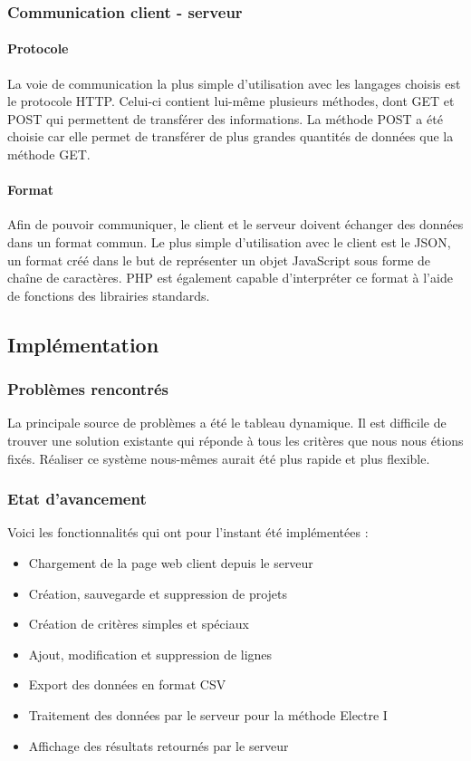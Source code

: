 \documentclass[a4paper]{article}
\begin{document}
\subsubsection{Communication client - serveur}

\paragraph{Protocole} La voie de communication la plus simple d'utilisation avec les langages choisis est le protocole HTTP. Celui-ci contient lui-même plusieurs méthodes, dont GET et POST qui permettent de transférer des informations. La méthode POST a été choisie car elle permet de transférer de plus grandes quantités de données que la méthode GET.

\paragraph{Format} Afin de pouvoir communiquer, le client et le serveur doivent échanger des données dans un format commun. Le plus simple d'utilisation avec le client est le JSON, un format créé dans le but de représenter un objet JavaScript sous forme de chaîne de caractères. PHP est également capable d'interpréter ce format à l'aide de fonctions des librairies standards. 

\newpage

\subsection{Implémentation}

\subsubsection{Problèmes rencontrés}

La principale source de problèmes a été le tableau dynamique. Il est difficile de trouver une solution existante qui réponde à tous les critères que nous nous étions fixés. Réaliser ce système nous-mêmes aurait été plus rapide et plus flexible.

\subsubsection{Etat d'avancement}

Voici les fonctionnalités qui ont pour l'instant été implémentées :

\begin{itemize}
\item Chargement de la page web client depuis le serveur
\item Création, sauvegarde et suppression de projets
\item Création de critères simples et spéciaux
\item Ajout, modification et suppression de lignes
\item Export des données en format CSV
\item Traitement des données par le serveur pour la méthode Electre I
\item Affichage des résultats retournés par le serveur
\end{itemize}
\end{document}
